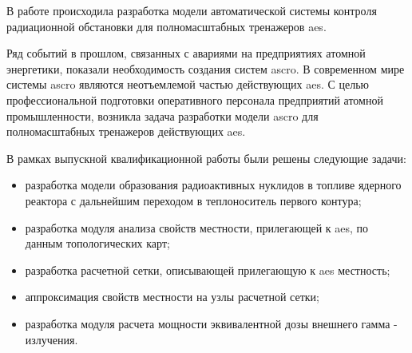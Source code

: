 
В работе происходила разработка модели автоматической системы контроля радиационной обстановки для полномасштабных 
тренажеров \ac{aes}. 

Ряд событий в прошлом, связанных с авариями на предприятиях атомной энергетики, показали необходимость создания систем 
\ac{ascro}. В современном мире системы \ac{ascro} являются неотъемлемой частью действующих \ac{aes}. С целью 
профессиональной подготовки оперативного персонала предприятий атомной промышленности, возникла задача разработки модели 
\ac{ascro} для полномасштабных тренажеров действующих \ac{aes}.

В рамках выпускной квалификационной работы были решены следующие задачи:

\begin{itemize}
  \item разработка модели образования радиоактивных нуклидов в топливе ядерного реактора с дальнейшим переходом в 
  	теплоноситель первого контура;
  \item разработка модуля анализа свойств местности, прилегающей к \ac{aes}, по данным топологических карт;
  \item разработка расчетной сетки, описывающей прилегающую к \ac{aes} местность;
  \item аппроксимация свойств местности на узлы расчетной сетки;
  \item разработка модуля расчета мощности эквивалентной дозы внешнего гамма - излучения.
\end{itemize}

